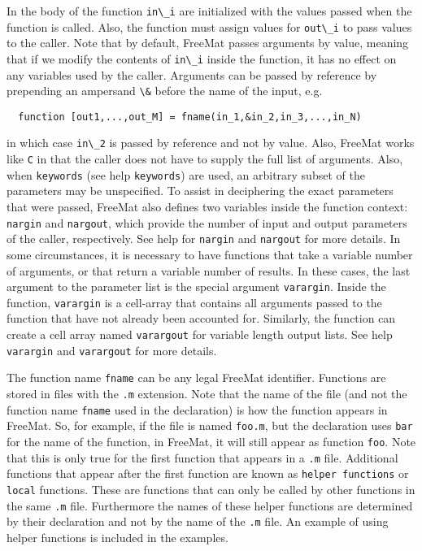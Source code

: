 In the body of the function \verb|in\_i| are initialized with the
values passed when the function is called.  Also, the function
must assign values for \verb|out\_i| to pass values to the caller.
Note that by default, FreeMat passes arguments by value, meaning
that if we modify the contents of \verb|in\_i| inside the function,
it has no effect on any variables used by the caller.  Arguments
can be passed by reference by prepending an ampersand \verb|\&|
before the name of the input, e.g.
\begin{verbatim}
  function [out1,...,out_M] = fname(in_1,&in_2,in_3,...,in_N)
\end{verbatim}
in which case \verb|in\_2| is passed by reference and not by value.
Also, FreeMat works like \verb|C| in that the caller does not have
to supply the full list of arguments.  Also, when \verb|keywords|
(see help \verb|keywords|) are used, an arbitrary subset of the
parameters may be unspecified. To assist in deciphering
the exact parameters that were passed,
FreeMat also defines two variables inside the function context:
\verb|nargin| and \verb|nargout|, which provide the number of input
and output parameters of the caller, respectively. See help for
\verb|nargin| and \verb|nargout| for more details.  In some
circumstances, it is necessary to have functions that
take a variable number of arguments, or that return a variable
number of results.  In these cases, the last argument to the
parameter list is the special argument \verb|varargin|.  Inside
the function, \verb|varargin| is a cell-array that contains
all arguments passed to the function that have not already
been accounted for.  Similarly, the function can create a
cell array named \verb|varargout| for variable length output lists.
See help \verb|varargin| and \verb|varargout| for more details.

The function name \verb|fname| can be any legal FreeMat identifier.
Functions are stored in files with the \verb|.m| extension.  Note
that the name of the file (and not the function name \verb|fname|
used in the declaration) is how the function appears in FreeMat.
So, for example, if the file is named \verb|foo.m|, but the declaration
uses \verb|bar| for the name of the function, in FreeMat, it will
still appear as function \verb|foo|.  Note that this is only true
for the first function that appears in a \verb|.m| file.  Additional
functions that appear after the first function are known as
\verb|helper functions| or \verb|local| functions.  These are functions that
can only be called by other functions in the same \verb|.m| file.  Furthermore
the names of these helper functions are determined by their declaration
and not by the name of the \verb|.m| file.  An example of using
helper functions is included in the examples.

